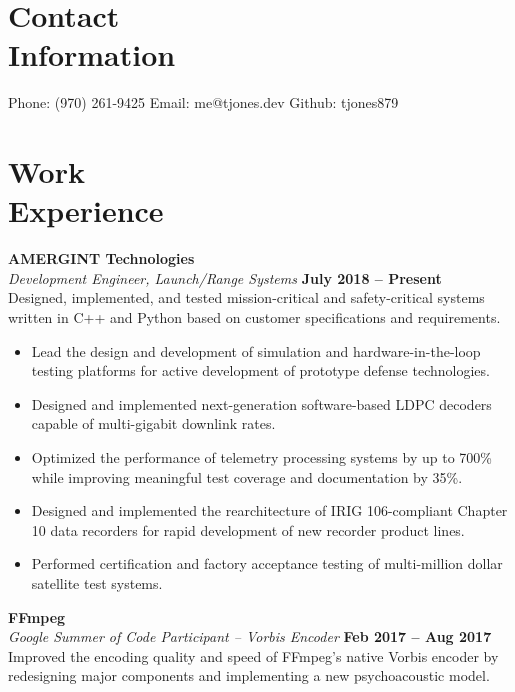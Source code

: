 \documentclass[margin,line]{resume}
\begin{document}
\begin{resume}
    \section{\mysidestyle Contact\\Information}

    Phone: (970) 261-9425 \hfill Email: me@tjones.dev  \hfill Github: tjones879\vspace{0mm}\\\vspace{-4.5mm}

    \section{\mysidestyle Work\\Experience}

    \textbf{AMERGINT Technologies} \vspace{1mm}\\\vspace{1mm}%
    \textsl{Development Engineer, Launch/Range Systems} \hfill \textbf{July 2018 -- Present}\\
      Designed, implemented, and tested mission-critical and safety-critical systems written
      in C++ and Python based on customer specifications and requirements.
      \begin{itemize}
      \item Lead the design and development of simulation and hardware-in-the-loop testing platforms
            for active development of prototype defense technologies.
      \item Designed and implemented next-generation software-based LDPC decoders capable of
            multi-gigabit downlink rates.
      \item Optimized the performance of telemetry processing systems by 
            up to 700\% while improving meaningful test coverage and documentation by 35\%.
      \item Designed and implemented the rearchitecture of IRIG 106-compliant
            Chapter 10 data recorders for rapid development of new recorder product lines.
      \item Performed certification and factory acceptance testing of multi-million dollar
            satellite test systems.
      \end{itemize}


    \textbf{FFmpeg} \vspace{1mm}\\\vspace{1mm}%
    \textsl{Google Summer of Code Participant -- Vorbis Encoder} \hfill \textbf{Feb 2017 -- Aug 2017}\\
    Improved the encoding quality and speed of FFmpeg's native Vorbis
    encoder by redesigning major components and implementing a new
    psychoacoustic model.


\end{resume}
\end{document}
